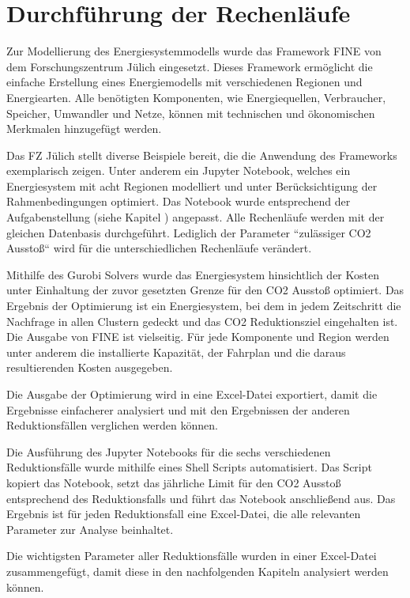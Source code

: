 \section{Durchführung der Rechenläufe}
Zur Modellierung des Energiesystemmodells wurde das Framework FINE von dem Forschungszentrum Jülich eingesetzt.
Dieses Framework ermöglicht die einfache Erstellung eines Energiemodells mit verschiedenen Regionen und Energiearten. Alle benötigten Komponenten, wie Energiequellen, Verbraucher, Speicher, Umwandler und Netze, können mit technischen und ökonomischen Merkmalen hinzugefügt werden. 

Das FZ Jülich stellt diverse Beispiele bereit, die die Anwendung des Frameworks exemplarisch zeigen. Unter anderem ein Jupyter Notebook, welches ein Energiesystem mit acht Regionen modelliert und unter Berücksichtigung der Rahmenbedingungen optimiert.  Das Notebook wurde entsprechend der Aufgabenstellung (siehe Kapitel ) angepasst. Alle Rechenläufe werden mit der gleichen Datenbasis durchgeführt. Lediglich der Parameter ``zulässiger CO2 Ausstoß`` wird für die unterschiedlichen Rechenläufe verändert. 

Mithilfe des Gurobi Solvers wurde das Energiesystem hinsichtlich der Kosten unter Einhaltung der zuvor gesetzten Grenze für den CO2 Ausstoß optimiert. Das Ergebnis der Optimierung ist ein Energiesystem, bei dem in jedem Zeitschritt die Nachfrage in allen Clustern gedeckt und das CO2 Reduktionsziel eingehalten ist. Die Ausgabe von FINE ist vielseitig. Für jede Komponente und Region werden unter anderem die installierte Kapazität, der Fahrplan und die daraus resultierenden Kosten ausgegeben.

Die Ausgabe der Optimierung wird in eine Excel-Datei exportiert, damit die Ergebnisse einfacherer analysiert und mit den Ergebnissen der anderen Reduktionsfällen verglichen werden können. 

Die Ausführung des Jupyter Notebooks für die sechs verschiedenen Reduktionsfälle wurde mithilfe eines Shell Scripts automatisiert. Das Script kopiert das Notebook, setzt das jährliche Limit für den CO2 Ausstoß entsprechend des Reduktionsfalls und führt das Notebook anschließend aus. Das Ergebnis ist für jeden Reduktionsfall eine Excel-Datei, die alle relevanten Parameter zur Analyse beinhaltet.

Die wichtigsten Parameter aller Reduktionsfälle wurden in einer Excel-Datei zusammengefügt, damit diese in den nachfolgenden Kapiteln analysiert werden können.
